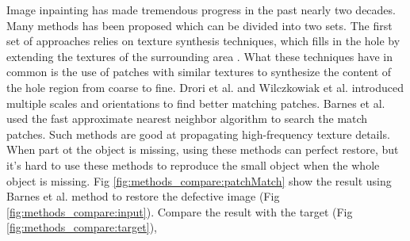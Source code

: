 \documentclass{IEEE_lsens}
\begin{document}
\IEEEpubidadjcol
Image inpainting has made tremendous progress in the past nearly two decades. Many methods has been proposed which can be divided into two sets. The first set of approaches relies on texture synthesis techniques, which fills in the hole by extending the textures of the surrounding area \cite{Efros1999::Texture,Drori2003::Fragment,Wilczkowiak2005::Hole,Barnes2009:AToG:PatchMatch:}. What these techniques have in common is the use of patches with similar textures to synthesize the content of the hole region from coarse to fine. Drori et al. \cite{Drori2003::Fragment} and Wilczkowiak et al. \cite{Wilczkowiak2005::Hole} introduced multiple scales and orientations to find better matching patches. Barnes et al. \cite{Barnes2009:AToG:PatchMatch:} used the fast approximate nearest neighbor algorithm to search the match patches. Such methods are good at propagating high-frequency texture details. When part ot the object is missing, using these methods can perfect restore, but it's hard to use these methods to reproduce the small object when the whole object is missing. Fig \ref{fig:methods_compare:patchMatch} show the result using Barnes et al. \cite{Barnes2009:AToG:PatchMatch:} method to restore the defective image (Fig \ref{fig:methods_compare:input}). Compare the result with the target (Fig \ref{fig:methods_compare:target}), 
\end{document}
